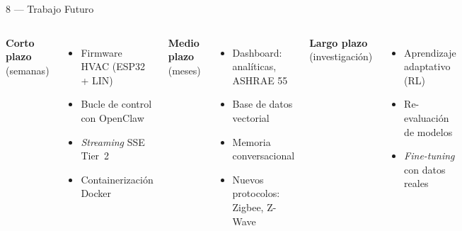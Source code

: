 \begin{frame}{8 — Trabajo Futuro}
  \hypertarget{s:futuro}{}
  \centering
  \footnotesize
  \begin{columns}[T]
    \textbf{Corto plazo}\\[0.1cm]
    {\scriptsize (semanas)}
    \vspace{0.15cm}
    \begin{itemize}
      \item Firmware HVAC (ESP32 + LIN)
      \item Bucle de control con OpenClaw
      \item \textit{Streaming} SSE Tier~2
      \item Containerización Docker
    \end{itemize}

    \textbf{Medio plazo}\\[0.1cm]
    {\scriptsize (meses)}
    \vspace{0.15cm}
    \begin{itemize}
      \item Dashboard: analíticas, ASHRAE 55
      \item Base de datos vectorial
      \item Memoria conversacional
      \item Nuevos protocolos: Zigbee, Z-Wave
    \end{itemize}

    \textbf{Largo plazo}\\[0.1cm]
    {\scriptsize (investigación)}
    \vspace{0.15cm}
    \begin{itemize}
      \item Aprendizaje adaptativo (RL)
      \item Re-evaluación de modelos
      \item \textit{Fine-tuning} con datos reales
    \end{itemize}
  \end{columns}
\end{frame}

